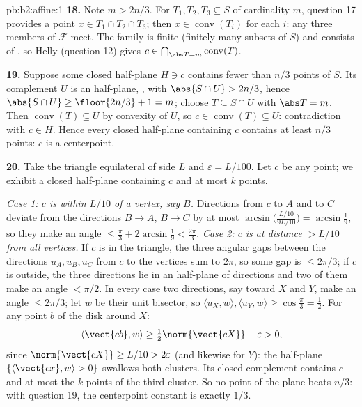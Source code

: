 \begin{solution}{pb:b2:affine:1}
\textbf{18.} Note $m > 2n/3$. For $T_1, T_2, T_3 \subseteq S$
of cardinality $m$, question 17 provides a point $x \in T_1
\cap T_2 \cap T_3$; then $x \in \operatorname{conv}(T_i)$ for
each $i$: any three members of $\mathcal F$ meet. The family
is finite (finitely many subsets of $S$) and consists of
, so Helly (question 12) gives $c \in
\bigcap_{\abs T = m}\operatorname{conv}(T)$.

\textbf{19.} Suppose some closed half-plane $H \ni c$
contains fewer than $n/3$ points of $S$. Its complement $U$
is an  half-plane, , with $\abs{S \cap U} > 2n/3$,
hence $\abs{S \cap U} \geq \floor{2n/3} + 1 = m$; choose $T
\subseteq S \cap U$ with $\abs T = m$. Then
$\operatorname{conv}(T) \subseteq U$ by convexity of $U$, so
$c \in \operatorname{conv}(T) \subseteq U$: contradiction
with $c \in H$. Hence every closed half-plane containing $c$
contains at least $n/3$ points: $c$ is a centerpoint.

\textbf{20.} Take the triangle equilateral of side $L$ and
$\varepsilon = L/100$. Let $c$ be any point; we exhibit a
closed half-plane containing $c$ and at most $k$ points.

\emph{Case 1: $c$ is within $L/10$ of a vertex, say $B$.}
Directions from $c$ to $A$ and to $C$ deviate from the
directions $B \to A$, $B \to C$ by at most
$\arcsin\bigl(\tfrac{L/10}{9L/10}\bigr) = \arcsin\tfrac19$,
so they make an angle $\leq \tfrac\pi3 + 2\arcsin\tfrac19 <
\tfrac{2\pi}3$. \emph{Case 2: $c$ is at distance $> L/10$
from all vertices.} If $c$ is in the triangle, the three
angular gaps between the directions $u_A, u_B, u_C$ from $c$
to the vertices sum to $2\pi$, so some gap is $\leq 2\pi/3$;
if $c$ is outside, the three directions lie in an 
half-plane of directions and two of them make an angle $<
\pi/2$. In every case two directions, say toward $X$ and $Y$,
make an angle $\leq 2\pi/3$; let $w$ be their unit bisector,
so $\langle u_X, w\rangle, \langle u_Y, w\rangle \geq
\cos\tfrac\pi3 = \tfrac12$. For any point $b$ of the disk
around $X$:
\[
\langle \vect{cb}, w\rangle \geq
\tfrac12\norm{\vect{cX}} - \varepsilon > 0,
\]
since $\norm{\vect{cX}} \geq L/10 > 2\varepsilon$ (and
likewise for $Y$): the  half-plane $\{\langle \vect{cx},
w\rangle > 0\}$ swallows both clusters. Its closed
complement contains $c$ and at most the $k$ points of the
third cluster. So no point of the plane beats $n/3$: with
question 19, the centerpoint constant is exactly $1/3$.


\end{solution}
